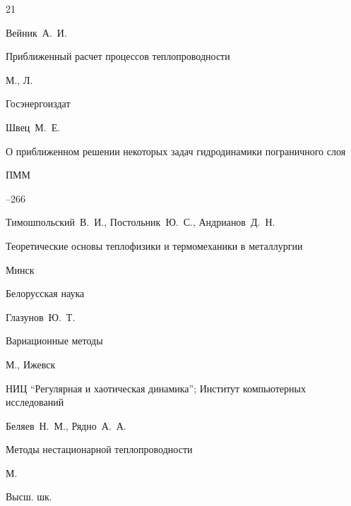 \begin{thebibliography}{21}

\by Вейник~А.~И.

\book Приближенный расчет процессов теплопроводности

\publaddr М., Л.

\publ Госэнергоиздат






\by Швец~М.~Е.

\paper О приближенном решении некоторых задач гидродинамики пограничного слоя

\jour ПММ




--266




\by Тимошпольский~В.~И., Постольник~Ю.~С., Андрианов~Д.~Н.

\book Теоретические основы теплофизики и термомеханики в металлургии

\publaddr Минск

\publ Белорусская наука






\by Глазунов~Ю.~Т.

\book Вариационные методы

\publaddr М., Ижевск

\publ НИЦ ``Регулярная и хаотическая динамика''; Институт компьютерных исследований






\by Беляев~Н.~М., Рядно~А.~А.

\book Методы нестационарной теплопроводности

\publaddr М.

\publ Высш. шк.








\end{thebibliography}
